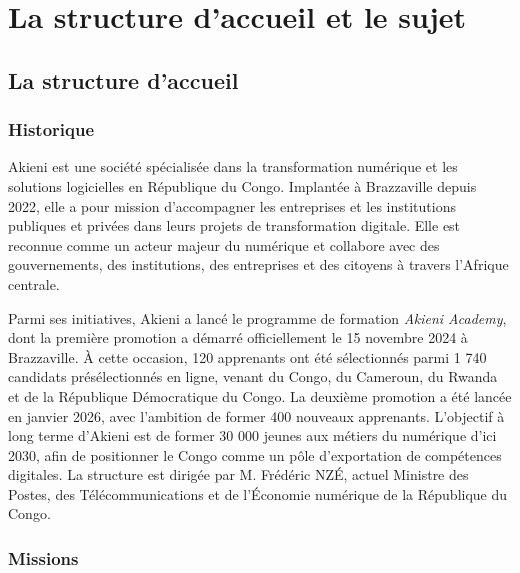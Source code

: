 \chapter{La structure d'accueil et le sujet}
\pagestyle{styleGlobal}
\label{chap:structure_sujet}

\section{La structure d'accueil}

\subsection{Historique}

Akieni est une société spécialisée dans la transformation numérique et les solutions logicielles en République du Congo. Implantée à Brazzaville depuis 2022, elle a pour mission d'accompagner les entreprises et les institutions publiques et privées dans leurs projets de transformation digitale. Elle est reconnue comme un acteur majeur du numérique et collabore avec des gouvernements, des institutions, des entreprises et des citoyens à travers l’Afrique centrale. 

Parmi ses initiatives, Akieni a lancé le programme de formation \textit{Akieni Academy}, dont la première promotion a démarré officiellement le 15 novembre 2024 à Brazzaville. À cette occasion, 120 apprenants ont été sélectionnés parmi 1 740 candidats présélectionnés en ligne, venant du Congo, du Cameroun, du Rwanda et de la République Démocratique du Congo. La deuxième promotion a été lancée en janvier 2026, avec l'ambition de former 400 nouveaux apprenants. L'objectif à long terme d'Akieni est de former 30 000 jeunes aux métiers du numérique d'ici 2030, afin de positionner le Congo comme un pôle d'exportation de compétences digitales. La structure est dirigée par M. Frédéric NZÉ, actuel Ministre des Postes, des Télécommunications et de l'Économie numérique de la République du Congo.

\subsection{Missions}

